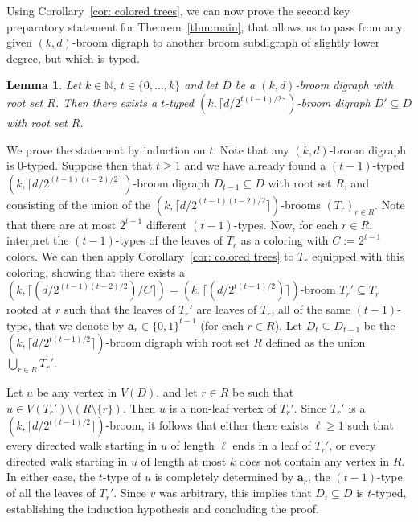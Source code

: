 \documentclass[a4paper,11pt]{article}
\makeatletter
\renewenvironment{proof}[1][\proofname] {\par\pushQED{\qed}\normalfont\topsep6\p@\@plus6\p@\relax\trivlist\item[\hskip\labelsep\bfseries#1\@addpunct{.}]\ignorespaces}{\popQED\endtrivlist\@endpefalse}
\newtheorem{lemma}[theorem]{\bf Lemma}
\theoremstyle{definition}
\makeatother
\begin{document}
Using Corollary~\ref{cor: colored trees}, we can now prove the second key preparatory statement for Theorem~\ref{thm:main}, that allows us to pass from any given $(k,d)$-broom digraph to another broom subdigraph of slightly lower degree, but which is typed.
\begin{lemma}\label{lem: get typed}
    Let $k\in \mathbb{N}$, $t\in \{0,\ldots,k\}$ and let $D$ be a $(k,d)$-broom digraph with root set $R$. Then there exists a $t$-typed $(k,\lceil d/2^{t(t-1)/2}\rceil)$-broom digraph $D'\subseteq D$ with root set $R$.
\end{lemma}
\begin{proof}
    We prove the statement by induction on $t$. Note that any $(k,d)$-broom digraph is $0$-typed. Suppose then that $t\geq 1$ and we have already found a $(t-1)$-typed $(k,\lceil d/2^{(t-1)(t-2)/2}\rceil)$-broom digraph $D_{t-1}\subseteq D$ with root set $R$, and consisting of the union of the $(k,\lceil d/2^{(t-1)(t-2)/2}\rceil)$-brooms $(T_r)_{r\in R}$. Note that there are at most $2^{t-1}$ different $(t-1)$-types. Now, for each $r\in R$, interpret the $(t-1)$-types of the leaves of $T_r$ as a coloring with $C:=2^{t-1}$ colors. We can then apply Corollary~\ref{cor: colored trees} to $T_r$ equipped with this coloring, showing that there exists a $(k,\lceil (d/2^{(t-1)(t-2)/2})/C\rceil)=(k,\lceil (d/2^{t(t-1)/2})\rceil)$-broom $T_r'\subseteq T_r$ rooted at $r$ such that the leaves of $T_r'$ are leaves of $T_r$, all of the same $(t-1)$-type, that we denote by $\mathbf{a}_r\in \{0,1\}^{t-1}$ (for each $r\in R$). Let $D_t\subseteq D_{t-1}$ be the $(k,\lceil d/2^{t(t-1)/2}\rceil)$-broom digraph with root set $R$ defined as the union $\bigcup_{r\in R}{T_r'}$.
    
    Let $u$ be any vertex in $V(D)$, and let $r\in R$ be such that $u\in V(T_r')\setminus (R\setminus \{r\})$. Then $u$ is a non-leaf vertex of $T_r'$. Since $T_r'$ is a $(k,\lceil d/2^{t(t-1)/2}\rceil)$-broom, it follows that either there exists $\ell\ge 1$ such that every directed walk starting in $u$ of length $\ell$ ends in a leaf of $T_r'$, or every directed walk starting in $u$ of length at most $k$ does not contain any vertex in $R$. In either case, the $t$-type of $u$ is completely determined by $\mathbf{a}_r$, the $(t-1)$-type of all the leaves of $T_r'$. Since $v$ was arbitrary, this implies that $D_{t}\subseteq D$ is $t$-typed, establishing the induction hypothesis and concluding the proof.
\end{proof}
\end{document}
